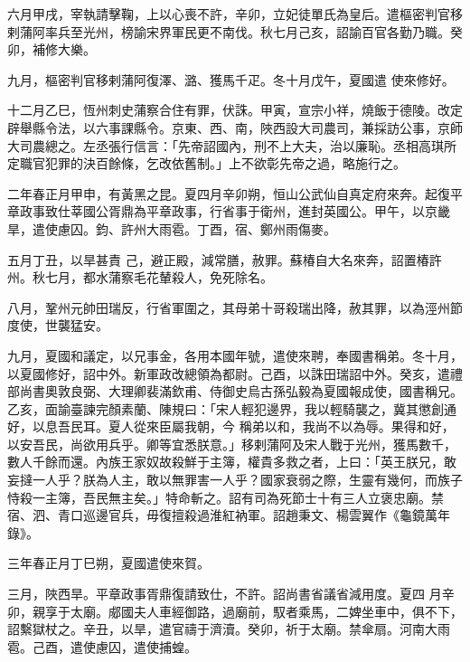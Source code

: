 \begin{pinyinscope}
 六月甲戌，宰執請擊鞠，上以心喪不許，辛卯，立妃徒單氏為皇后。遣樞密判官移剌蒲阿率兵至光州，榜諭宋界軍民更不南伐。秋七月己亥，詔諭百官各勤乃職。癸卯，補修大樂。



 九月，樞密判官移剌蒲阿復澤、潞、獲馬千疋。冬十月戊午，夏國遣
 使來修好。



 十二月乙巳，恆州刺史蒲察合住有罪，伏誅。甲寅，宣宗小祥，燒飯于德陵。改定辟舉縣令法，以六事課縣令。京東、西、南，陜西設大司農司，兼採訪公事，京師大司農總之。左丞張行信言：「先帝詔國內，刑不上大夫，治以廉恥。丞相高琪所定職官犯罪的決百餘條，乞改依舊制。」上不欲彰先帝之過，略施行之。



 二年春正月甲申，有黃黑之昆。夏四月辛卯朔，恒山公武仙自真定府來奔。起復平章政事致仕莘國公胥鼎為平章政事，行省事于衛州，進封英國公。甲午，以京畿旱，遣使慮囚。鈞、許州大雨雹。丁酉，宿、鄭州雨傷麥。



 五月丁丑，以旱甚責
 己，避正殿，減常膳，赦罪。蘇椿自大名來奔，詔置椿許州。秋七月，都水蒲察毛花輦殺人，免死除名。



 八月，鞏州元帥田瑞反，行省軍圍之，其母弟十哥殺瑞出降，赦其罪，以為涇州節度使，世襲猛安。



 九月，夏國和議定，以兄事金，各用本國年號，遣使來聘，奉國書稱弟。冬十月，以夏國修好，詔中外。新軍政改總領為都尉。己酉，以誅田瑞詔中外。癸亥，遣禮部尚書奧敦良弼、大理卿裴滿欽甫、侍御史烏古孫弘毅為夏國報成使，國書稱兄。乙亥，面諭臺諫完顏素蘭、陳規曰：「宋人輕犯邊界，我以輕騎襲之，冀其懲創通好，以息吾民耳。夏人從來臣屬我朝，今
 稱弟以和，我尚不以為辱。果得和好，以安吾民，尚欲用兵乎。卿等宜悉朕意。」移剌蒲阿及宋人戰于光州，獲馬數千，數人千餘而還。內族王家奴故殺鮮于主簿，權貴多救之者，上曰：「英王朕兄，敢妄撻一人乎？朕為人主，敢以無罪害一人乎？國家衰弱之際，生靈有幾何，而族子恃殺一主簿，吾民無主矣。」特命斬之。詔有司為死節士十有三人立褒忠廟。禁宿、泗、青口巡邊官兵，毋復擅殺過淮紅衲軍。詔趙秉文、楊雲翼作《龜鏡萬年錄》。



 三年春正月丁巳朔，夏國遣使來賀。



 三月，陜西旱。平章政事胥鼎復請致仕，不許。詔尚書省議省減用度。夏四
 月辛卯，親享于太廟。郕國夫人車經御路，過廟前，馭者乘馬，二婢坐車中，俱不下，詔繫獄杖之。辛丑，以旱，遣官禱于濟瀆。癸卯，祈于太廟。禁傘扇。河南大雨雹。己酉，遣使慮囚，遣使捕蝗。




\end{pinyinscope}
